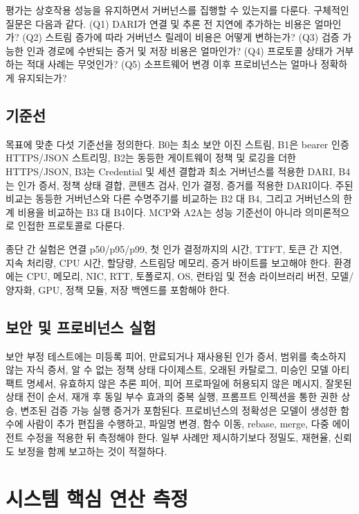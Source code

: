 \documentclass[10pt]{article}
\begin{document}
평가는 상호작용 성능을 유지하면서 거버넌스를 집행할 수 있는지를 다룬다. 구체적인 질문은 다음과 같다. (Q1) DARI가 연결 및 추론 전 지연에 추가하는 비용은 얼마인가? (Q2) 스트림 증가에 따라 거버넌스 릴레이 비용은 어떻게 변하는가? (Q3) 검증 가능한 인과 경로에 수반되는 증거 및 저장 비용은 얼마인가? (Q4) 프로토콜 상태가 거부하는 적대 사례는 무엇인가? (Q5) 소프트웨어 변경 이후 프로비넌스는 얼마나 정확하게 유지되는가?

\subsection{기준선}

목표에 맞춘 다섯 기준선을 정의한다. B0는 최소 보안 이진 스트림, B1은 bearer 인증 HTTPS/JSON 스트리밍, B2는 동등한 게이트웨이 정책 및 로깅을 더한 HTTPS/JSON, B3는 Credential 및 세션 결합과 최소 거버넌스를 적용한 DARI, B4는 인가 증서, 정책 상태 결합, 콘텐츠 검사, 인가 결정, 증거를 적용한 DARI이다. 주된 비교는 동등한 거버넌스와 다른 수명주기를 비교하는 B2 대 B4, 그리고 거버넌스의 한계 비용을 비교하는 B3 대 B4이다. MCP와 A2A는 성능 기준선이 아니라 의미론적으로 인접한 프로토콜로 다룬다.

종단 간 실험은 연결 p50/p95/p99, 첫 인가 결정까지의 시간, TTFT, 토큰 간 지연, 지속 처리량, CPU 시간, 할당량, 스트림당 메모리, 증거 바이트를 보고해야 한다. 환경에는 CPU, 메모리, NIC, RTT, 토폴로지, OS, 런타임 및 전송 라이브러리 버전, 모델/양자화, GPU, 정책 모듈, 저장 백엔드를 포함해야 한다.

\subsection{보안 및 프로비넌스 실험}

보안 부정 테스트에는 미등록 피어, 만료되거나 재사용된 인가 증서, 범위를 축소하지 않는 자식 증서, 알 수 없는 정책 상태 다이제스트, 오래된 카탈로그, 미승인 모델 아티팩트 명세서, 유효하지 않은 추론 피어, 피어 프로파일에 허용되지 않은 메시지, 잘못된 상태 전이 순서, 재개 후 동일 부수 효과의 중복 실행, 프롬프트 인젝션을 통한 권한 상승, 변조된 검증 가능 실행 증거가 포함된다. 프로비넌스의 정확성은 모델이 생성한 함수에 사람이 추가 편집을 수행하고, 파일명 변경, 함수 이동, rebase, merge, 다중 에이전트 수정을 적용한 뒤 측정해야 한다. 일부 사례만 제시하기보다 정밀도, 재현율, 신뢰도 보정을 함께 보고하는 것이 적절하다.

\section{시스템 핵심 연산 측정}
\end{document}
